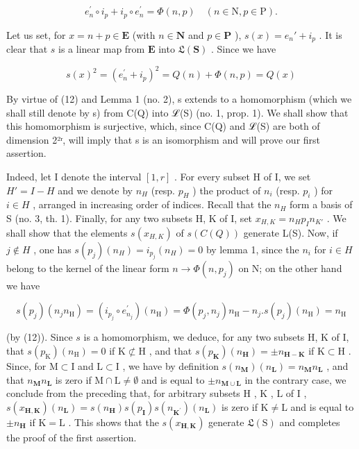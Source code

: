 \[
e _ {n} ^ {\prime} \circ i _ {p} + i _ {p} \circ e _ {n} ^ {\prime} = \Phi (n, p) \quad (n \in \mathrm{N}, p \in \mathrm{P}).\tag{12}
\]

Let us set, for \(x = n + p \in \mathbf{E}\) (with \(n \in \mathbf{N}\) and \(p \in \mathbf{P}\) ), \(s(x) = e_n' + i_p\) . It is clear that \(s\) is a linear map from \(\mathbf{E}\) into \(\mathfrak{L}(\mathbf{S})\) . Since we have

\[
s (x) ^ {2} = \left(e _ {n} ^ {\prime} + i _ {p}\right) ^ {2} = Q (n) + \Phi (n, p) = Q (x)
\]

By virtue of (12) and Lemma 1 (no. 2), s extends to a homomorphism (which we shall still denote by s) from C(Q) into ℒ(S) (no. 1, prop. 1). We shall show that this homomorphism is surjective, which, since C(Q) and ℒ(S) are both of dimension 2²ʳ, will imply that s is an isomorphism and will prove our first assertion.

Indeed, let I denote the interval \([1, r]\) . For every subset H of I, we set \(H' = I - H\) and we denote by \(n_{H}\) (resp. \(p_{H}\) ) the product of \(n_{i}\) (resp. \(p_{i}\) ) for \(i \in H\) , arranged in increasing order of indices. Recall that the \(n_{H}\) form a basis of S (no. 3, th. 1). Finally, for any two subsets H, K of I, set \(x_{H,K} = n_{H}p_{I}n_{K'}\) . We shall show that the elements \(s(x_{H,K})\) of \(s(C(Q))\) generate L(S). Now, if \(j \notin H\) , one has \(s(p_{j})(n_{H}) = i_{p_{j}}(n_{H}) = 0\) by lemma 1, since the \(n_{i}\) for \(i \in H\) belong to the kernel of the linear form \(n \to \Phi(n, p_{j})\) on N; on the other hand we have

\[
s \left(p _ {j}\right) \left(n _ {j} n _ {\mathrm{H}}\right) = \left(i _ {p _ {j}} \circ e _ {n _ {j}} ^ {\prime}\right) \left(n _ {\mathrm{H}}\right) = \Phi \left(p _ {j}, n _ {j}\right) n _ {\mathrm{H}} - n _ {j}. s \left(p _ {j}\right) \left(n _ {\mathrm{H}}\right) = n _ {\mathrm{H}}
\]

(by (12)). Since \(s\) is a homomorphism, we deduce, for any two subsets H, K of I, that \(s(p_{\mathrm{K}})(n_{\mathrm{H}}) = 0\) if \(\mathrm{K} \not\subset \mathrm{H}\) , and that \(s(p_{\mathbf{K}}) (n_{\mathbf{H}}) = \pm n_{\mathbf{H} - \mathbf{K}}\) if \(\mathrm{K} \subset \mathrm{H}\) . Since, for \(\mathrm{M} \subset \mathrm{I}\) and \(\mathrm{L} \subset \mathrm{I}\) , we have by definition \(s(n_{\mathbf{M}})(n_{\mathbf{L}}) = n_{\mathbf{M}}n_{\mathbf{L}}\) , and that \(n_{\mathbf{M}}n_{\mathbf{L}}\) is zero if \(\mathrm{M} \cap \mathrm{L} \neq \emptyset\) and is equal to \(\pm n_{\mathbf{M} \cup \mathbf{L}}\) in the contrary case, we conclude from the preceding that, for arbitrary subsets \(\mathrm{H}\) , \(\mathrm{K}\) , \(\mathrm{L}\) of \(\mathrm{I}\) , \(s(x_{\mathbf{H},\mathbf{K}})(n_{\mathbf{L}}) = s(n_{\mathbf{H}})s(p_{\mathbf{I}})s(n_{\mathbf{K}^{\prime}})(n_{\mathbf{L}})\) is zero if \(\mathrm{K} \neq \mathrm{L}\) and is equal to \(\pm n_{\mathbf{H}}\) if \(\mathrm{K} = \mathrm{L}\) . This shows that the \(s(x_{\mathbf{H},\mathbf{K}})\) generate \(\mathfrak{L}(\mathrm{S})\) and completes the proof of the first assertion.

